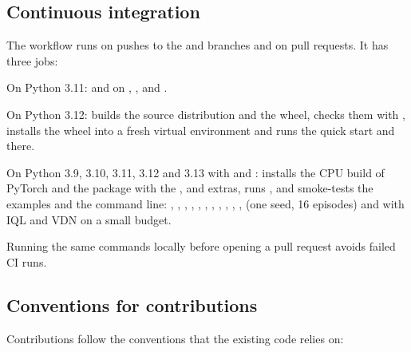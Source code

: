 \subsection{Continuous integration}

The workflow  runs on pushes to the
 and  branches and on pull requests. It has three
jobs:

\begin{description}[leftmargin=0.6cm,style=nextline]
  \item[\code{lint}] On Python 3.11:  and
     on , ,  and
    .
  \item[\code{package}] On Python 3.12: builds the source distribution and
    the wheel, checks them with , installs the
    wheel into a fresh virtual environment and runs the quick start and
     there.
  \item[\code{test}] On Python 3.9, 3.10, 3.11, 3.12 and 3.13 with
     and : installs the CPU
    build of PyTorch and the package with the , 
    and  extras, runs , and smoke-tests the examples
    and the command line: ,
    ,
    ,
    ,
    , ,
    ,
    ,
    , ,
    ,
     (one seed, 16 episodes) and
     with IQL and VDN on a small budget.
\end{description}

Running the same commands locally before opening a pull request avoids
failed CI runs.

\subsection{Conventions for contributions}

Contributions follow the conventions that the existing code relies on:

